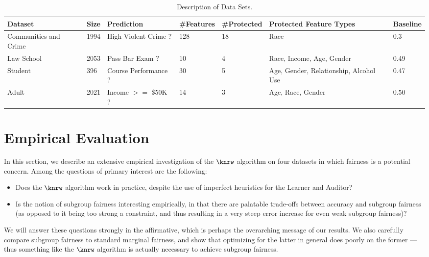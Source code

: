 
\begin{table}[t]
\centering
\begin{tiny}
\begin{tabular}{|l|l|l|l|l|l|l|}
\hline
{\bf Dataset}	& {\bf Size} & {\bf Prediction} & {\bf \#Features} & {\bf \#Protected} & {\bf Protected Feature Types} & {\bf Baseline}\\ \hline
Communities and Crime  & 1994 & High Violent Crime ? & 128 & 18 & Race & 0.3 \\ \hline
Law School	       & 2053 & Pass Bar Exam ? & 10 & 4 & Race, Income, Age, Gender & 0.49 \\ \hline
Student		       & 396  & Course Performance ? & 30 & 5 & Age, Gender, Relationship, Alcohol Use & 0.47 \\ \hline
Adult		       & 2021 & Income $>=$ \$50K ? & 14 & 3 & Age, Race, Gender & 0.50 \\ \hline
\end{tabular}
\end{tiny}
\caption{Description of Data Sets.}
\label{tab:datasets}
\end{table}

\section{Empirical Evaluation}


In this section, we describe an extensive empirical investigation of the $\knrw$ algorithm on
four datasets in which fairness is a potential concern.
Among the questions of primary interest are the following:
\begin{itemize}
\item Does the $\knrw$ algorithm work in practice, despite the use of imperfect heuristics for the Learner and Auditor?
\item Is the notion of subgroup fairness interesting empirically, in that there are palatable trade-offs between accuracy
	and subgroup fairness (as opposed to it
	being too strong a constraint, and thus resulting in a very steep error increase for even weak subgroup fairness)?
\end{itemize}
We will answer these questions strongly in the affirmative, which is perhaps the overarching message of our results.
We also carefully compare subgroup fairness to standard marginal fairness, and show that optimizing
	for the latter in general does poorly on the former --- thus something like the $\knrw$ algorithm is actually necessary
	to achieve subgroup fairness.

